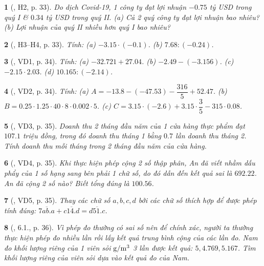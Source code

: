 \documentclass{article}
\newtheorem{baitoan}{}
\begin{document}
\begin{baitoan}[\cite{Binh_boi_duong_Toan_6_tap_2}, H2, p. 33]
	Do dịch Covid-19, 1 công ty đạt lợi nhuận $-0.75$ tỷ USD trong quý I \& $0.34$ tỷ USD trong quý II. (a) Cả 2 quý công ty đạt lợi nhuận bao nhiêu? (b) Lợi nhuận của quý II nhiều hơn quý I bao nhiêu?
\end{baitoan}

\begin{baitoan}[\cite{Binh_boi_duong_Toan_6_tap_2}, H3--H4, p. 33]
	Tính: (a) $-3.15\cdot(-0.1)$. (b) $7.68:(-0.24)$.
\end{baitoan}

\begin{baitoan}[\cite{Binh_boi_duong_Toan_6_tap_2}, VD1, p. 34]
	Tính: (a) $-32.721 + 27.04$. (b) $-2.49 -(-3.156)$. (c) $-2.15\cdot2.03$. (d) $10.165:(-2.14)$.
\end{baitoan}

\begin{baitoan}[\cite{Binh_boi_duong_Toan_6_tap_2}, VD2, p. 34]
	Tính: (a) $A = -13.8 -(-47.53) - \dfrac{316}{5} + 52.47$. (b) $B = 0.25\cdot1.25\cdot40\cdot8\cdot0.002\cdot5$. (c) $C = 3.15\cdot(-2.6) + 3.15\cdot\dfrac{3}{5} - 315\cdot0.08$.
\end{baitoan}

\begin{baitoan}[\cite{Binh_boi_duong_Toan_6_tap_2}, VD3, p. 35]
	Doanh thu 2 tháng đầu năm của 1 cửa hàng thực phẩm đạt $107.1$ triệu đồng, trong đó doanh thu tháng 1 bằng $0.7$ lần doanh thu tháng 2. Tính doanh thu mỗi tháng trong 2 tháng đầu năm của cửa hàng.
\end{baitoan}

\begin{baitoan}[\cite{Binh_boi_duong_Toan_6_tap_2}, VD4, p. 35]
	Khi thực hiện phép cộng 2 số thập phân, An đã viết nhầm dấu phẩy của 1 số hạng sang bên phải 1 chữ số, do đó dẫn đến kết quả sai là $692.22$. An đã cộng 2 số nào? Biết tổng đúng là $100.56$.
\end{baitoan}

\begin{baitoan}[\cite{Binh_boi_duong_Toan_6_tap_2}, VD5, p. 35]
	Thay các chữ số $a,b,c,d$ bởi các chữ số thích hợp để được phép tính đúng: $\overline{7ab.a} + \overline{c14.d} = \overline{d51.c}$.
\end{baitoan}

\begin{baitoan}[\cite{Binh_boi_duong_Toan_6_tap_2}, 6.1., p. 36]
	Vì phép đo thường có sai số nên để chính xác, người ta thường thực hiện phép đo nhiều lần rồi lấy kết quả trung bình cộng của các lần đo. Nam đo khối lượng riêng của 1 viên sỏi $\rm g{\tt/}m^3$ 3 lần được kết quả: $5,4.769,5.167$. Tìm khối lượng riêng của viên sỏi dựa vào kết quả đo của Nam.
\end{baitoan}
\end{document}
